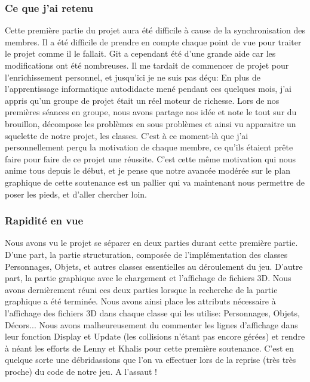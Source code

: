 \documentclass{article}
\begin{document}
\subsubsection{Ce que j'ai retenu}

Cette première partie du projet aura été difficile à cause de la synchronisation des membres. Il a été difficile de prendre en compte chaque point de vue pour traiter le projet comme il le fallait. Git a cependant été d'une grande aide car les modifications ont été nombreuses. Il me tardait de commencer de projet pour l'enrichissement personnel, et jusqu'ici je ne suis pas déçu: En plus de l'apprentissage informatique autodidacte mené pendant ces quelques mois, j'ai appris qu'un groupe de projet était un réel moteur de richesse. Lors de nos premières séances en groupe, nous avons partage nos idée et note le tout sur du brouillon, décompose les problèmes en sous problèmes et ainsi vu apparaitre un squelette de notre projet, les classes. C'est à ce moment-là que j'ai personnellement perçu la motivation de chaque membre, ce qu'ils étaient prête faire pour faire de ce projet une réussite. C'est cette même motivation qui nous anime tous depuis le début, et je pense que notre avancée modérée sur le plan graphique de cette soutenance est un pallier qui va maintenant nous permettre de poser les pieds, et d'aller chercher loin.

\subsubsection{Rapidité en vue}

Nous avons vu le projet se séparer en deux parties durant cette première partie. D'une part, la partie structuration, composée de l'implémentation des classes Personnages, Objets, et autres classes essentielles au déroulement du jeu. D'autre part, la partie graphique avec le chargement et l'affichage de fichiers 3D. Nous avons dernièrement réuni ces deux parties lorsque la recherche de la partie graphique a été terminée. Nous avons ainsi place les attributs nécessaire à l'affichage des fichiers 3D dans chaque classe qui les utilise: Personnages, Objets, Décors... Nous avons malheureusement du commenter les lignes d'affichage dans leur fonction Display et Update (les collisions n'étant pas encore gérées) et rendre à néant les efforts de Lenny et Khalis pour cette première soutenance. C'est en quelque sorte une débridassions que l'on va effectuer lors de la reprise (très très proche) du code de notre jeu. A l'assaut !
\end{document}
